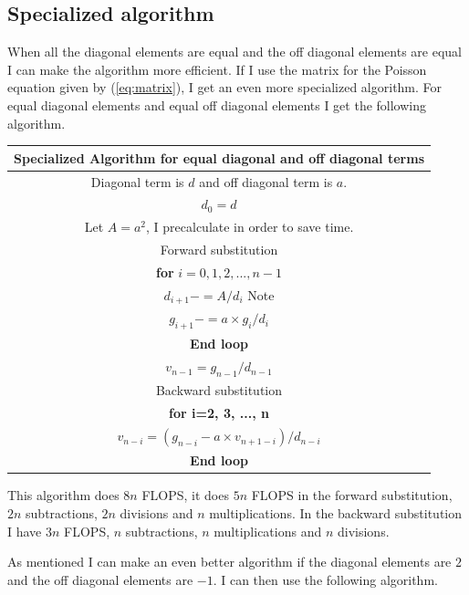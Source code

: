 \documentclass[12pt]{article}
\begin{document}
\subsection{Specialized algorithm}
When all the diagonal elements are equal and the off diagonal elements are equal I can make the algorithm more efficient. If I use the matrix for the Poisson equation given by (\ref{eq:matrix}), I get an even more specialized algorithm. For equal diagonal elements and equal off diagonal elements I get the following algorithm.


\begin{center}
  \begin{tabular}{||c||}
    \hline\hline
    \textbf{Specialized Algorithm for equal diagonal and off diagonal terms}\\
    \hline\hline
    Diagonal term is $d$ and off diagonal term is $a$.\\
    $d_0=d$\\
    Let $A=a^2$, I precalculate in order to save time.\\
    Forward substitution \\
    \textbf{for} $i=0,1,2,...,n-1$\\
      $d_{i+1}-=A/d_i$ Note \\
      $g_{i+1}-=a\times g_i/d_i$ \\
      \textbf{End loop} \\
      $v_{n-1}=g_{n-1}/d_{n-1}$\\
      Backward substitution \\
      \textbf{for i=2, 3, ..., n} \\
      $v_{n-i}=(g_{n-i}-a\times v_{n+1-i})/d_{n-i}$\\ 
      \textbf{End loop}\\
      \hline\hline
  \end{tabular}
\end{center}

This algorithm does $8n$ FLOPS, it does $5n$ FLOPS in the forward substitution, $2n$ subtractions, $2n$ divisions and $n$ multiplications. In the backward substitution I have $3n$ FLOPS, $n$ subtractions, $n$ multiplications and $n$ divisions.

As mentioned I can make an even better algorithm if the diagonal elements are $2$ and the off diagonal elements are $-1$. I can then use the following algorithm.
\end{document}
